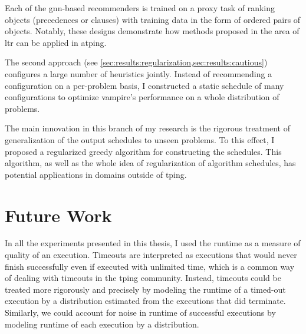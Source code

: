 Each of the \acrshort{gnn}-based recommenders is trained on a proxy task of ranking objects (precedences or clauses)
with training data in the form of ordered pairs of objects.
Notably, these designs demonstrate how methods proposed in the area of \acrlong{ltr}
can be applied in \gls{atping}.

The second approach (see \cref{sec:results:regularization,sec:results:cautious}) configures a large number of heuristics jointly.
Instead of recommending a configuration on a per-problem basis,
I constructed a static schedule of many configurations to optimize \gls{vampire}'s performance on a whole distribution of problems.

The main innovation in this branch of my research is the rigorous treatment of generalization of the output schedules to unseen problems.
To this effect, I proposed a regularized greedy algorithm for constructing the schedules.
This algorithm, as well as the whole idea of regularization of algorithm schedules, has potential applications in domains outside of \gls{tping}.


\section{Future Work}



In all the experiments presented in this thesis, I used the runtime as a measure of quality of an execution.
Timeouts are interpreted as executions that would never finish successfully even if executed with unlimited time, which is a common way of dealing with timeouts in the \gls{tping} community.
Instead, timeouts could be treated more rigorously and precisely by modeling the runtime of a timed-out execution by a distribution estimated from the executions that did terminate.
Similarly, we could account for noise in runtime of successful executions by modeling runtime of each execution by a distribution.


